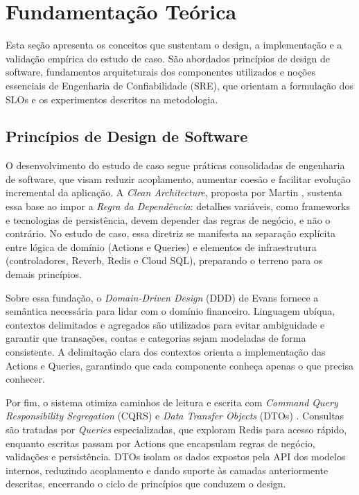\section{Fundamentação Teórica}
\label{sec:fundamentacao}

Esta seção apresenta os conceitos que sustentam o design, a implementação e a validação empírica do estudo de caso.
São abordados princípios de design de software, fundamentos arquiteturais dos componentes
utilizados e noções essenciais de Engenharia de Confiabilidade (SRE), que orientam
a formulação dos SLOs e os experimentos descritos na metodologia.

\subsection{Princípios de Design de Software}
\label{sec:principios_design}

O desenvolvimento do estudo de caso segue práticas consolidadas de engenharia de software,
que visam reduzir acoplamento, aumentar coesão e facilitar evolução incremental da aplicação.
A \textit{Clean Architecture}, proposta por Martin \cite{martin_clean_2017},
sustenta essa base ao impor a \textit{Regra da Dependência}: detalhes variáveis,
como frameworks e tecnologias de persistência, devem depender das regras de negócio,
e não o contrário. No estudo de caso, essa diretriz se manifesta na separação explícita
entre lógica de domínio (Actions e Queries) e elementos de infraestrutura
(controladores, Reverb, Redis e Cloud SQL), preparando o terreno para os demais princípios.

Sobre essa fundação, o \textit{Domain-Driven Design} (DDD) de Evans \cite{evans_ddd_2003}
fornece a semântica necessária para lidar com o domínio financeiro. Linguagem ubíqua,
contextos delimitados e agregados são utilizados para evitar ambiguidade e garantir que transações,
contas e categorias sejam modeladas de forma consistente. A delimitação clara dos
contextos orienta a implementação das Actions e Queries, garantindo que cada componente
conheça apenas o que precisa conhecer.

Por fim, o sistema otimiza caminhos de leitura e escrita com
\textit{Command Query Responsibility Segregation} (CQRS) \cite{fowler_cqrs_2011} e
\textit{Data Transfer Objects} (DTOs) \cite{fowler_peaa_2002}. Consultas são tratadas
por \textit{Queries} especializadas, que exploram Redis para acesso rápido, enquanto
escritas passam por Actions que encapsulam regras de negócio, validações e persistência.
DTOs isolam os dados expostos pela API dos modelos internos, reduzindo acoplamento
e dando suporte às camadas anteriormente descritas, encerrando o ciclo de princípios que conduzem o design.

